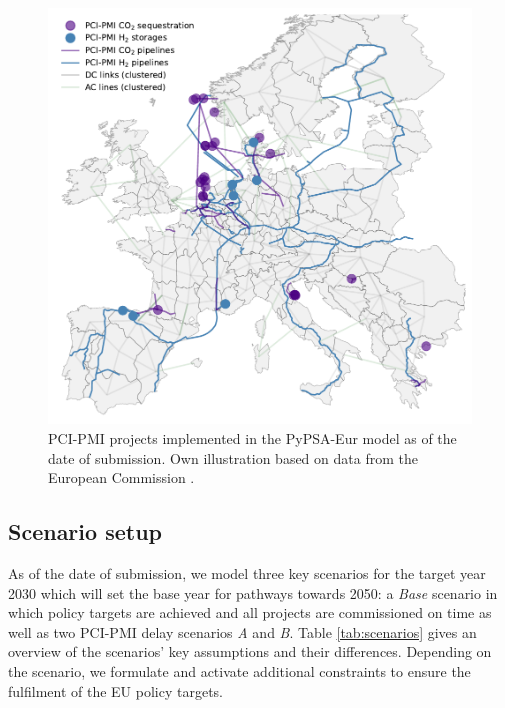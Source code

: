 \documentclass[final,5p,times,twocolumn]{elsarticle}
\let\autocite\cite
\begin{document}
\begin{figure}[t]
  \centering
  \includegraphics[width=\linewidth]{pci_pmi_projects_map}
  \caption{PCI-PMI projects implemented in the PyPSA-Eur model as of the date of submission. Own illustration based on data from the European Commission \autocite{europeancommissionPCIPMITransparencyPlatform2024}.}
  \label{fig:pci_pmi_projects_map}
\end{figure}


\subsection{Scenario setup}
\label{sec:scenario_setup}

As of the date of submission, we model three key scenarios for the target year 2030 which will set the base year for pathways towards 2050: a \textit{Base} scenario in which policy targets are achieved and all projects are commissioned on time as well as two PCI-PMI delay scenarios \textit{A} and \textit{B}. Table \ref{tab:scenarios} gives an overview of the scenarios' key assumptions and their differences. Depending on the scenario, we formulate and activate additional constraints to ensure the fulfilment of the EU policy targets.
\end{document}
